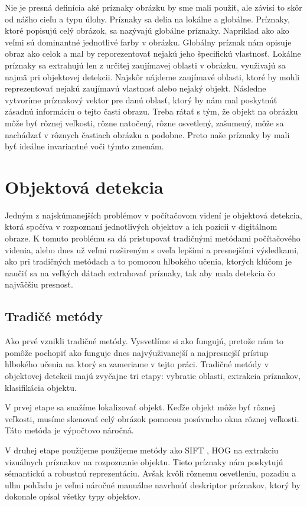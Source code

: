 Nie je presná definícia aké príznaky obrázku by sme mali použiť, ale závisí to skôr od nášho cieľu a typu úlohy. Príznaky sa delia na lokálne a globálne. Príznaky, ktoré popisujú celý obrázok, sa nazývajú globálne príznaky. Napríklad ako ako veľmi sú dominantné jednotlivé farby v obrázku. Globálny príznak nám opisuje obraz ako celok a mal by reporezentovať nejakú jeho špecifickú vlastnosť. Lokálne príznaky sa extrahujú len z určitej zaujímavej oblasti v obrázku, využivajú sa najmä pri objektovej detekcii. Najskôr nájdeme zaujímavé oblasti, ktoré by mohli reprezentovať nejakú zaujímavú vlastnosť alebo nejaký objekt. Následne vytvoríme príznakový vektor pre danú oblasť, ktorý by nám mal poskytnúť zásadnú informáciu o tejto časti obrazu. Treba rátať s tým, že objekt na obrázku môže byť rôznej veľkosti, rôzne natočený, rôzne osvetlený, zašumený, môže sa nachádzať v rôznych častiach obrázku a podobne. Preto naše príznaky by mali byť ideálne invariantné voči týmto zmenám.

\section{Objektová detekcia}

Jedným z najskúmanejších problémov v počítačovom videní je objektová detekcia, ktorá spočíva v rozpoznaní jednotlivých objektov a ich pozícii v digitálnom obraze. K tomuto problému sa dá pristupovať tradičnými metódami počítačového videnia, alebo dnes už veľmi rozšireným s oveľa lepšími a presnejšími výsledkami, ako pri tradičných metódach a to pomocou hlbokého učenia, ktorých klúčom je naučiť sa na veľkých dátach extrahovať príznaky, tak aby mala detekcia čo najväčšiu presnosť.

\subsection{Tradičé metódy}
Ako prvé vznikli tradičné metódy. Vysvetlíme si ako fungujú, pretože nám to pomôže pochopiť ako funguje dnes najvýuživanejší a najpresnejší prístup hlbokého učenia na ktorý sa zameriame v tejto práci. Tradičné metódy v objektovej detekcii majú zvyčajne tri etapy: vybratie oblasti, extrakcia príznakov, klasifikácia objektu. 

V prvej etape sa snažíme lokalizovať objekt. Keďže objekt môže byť rôznej veľkosti, musíme skenovať celý obrázok pomocou posúvneho okna rôznej veľkosti. Táto metóda je výpočtovo náročná. 

V druhej etape použijeme použijeme metódy ako SIFT \cite{SIFT}, HOG \cite{HOG} na extrakciu vizuálnych príznakov na rozpoznanie objektu. Tieto príznaky nám poskytujú sémantickú a robustnú reprezentáciu. Avšak kvôli rôznemu osvetleniu, pozadiu a ulhu pohľadu je veľmi náročné manuálne navrhnúť deskriptor príznakov, ktorý by dokonale opísal všetky typy objektov. 

